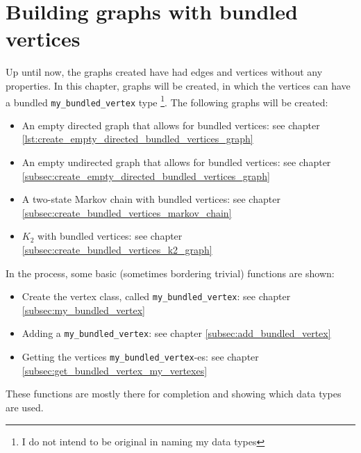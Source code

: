\chapter{Building graphs with bundled vertices}
\label{sec:Building-graphs-with-bundled-vertices}

Up until now, the graphs created have had edges and vertices without any
properties.
In this chapter, graphs will be created, in which the vertices can have
a bundled \verb;my_bundled_vertex; type
\footnote{I do not intend to be original in naming my data types}.
The following graphs will be created:

\begin{itemize}
  \item An empty directed graph that allows for bundled vertices: 
    see chapter \ref{lst:create_empty_directed_bundled_vertices_graph}
  \item An empty undirected graph that allows for bundled vertices: 
    see chapter \ref{subsec:create_empty_directed_bundled_vertices_graph}
  \item A two-state Markov chain with bundled vertices: 
    see chapter \ref{subsec:create_bundled_vertices_markov_chain}
  \item $K_{2}$ with bundled vertices: 
    see chapter \ref{subsec:create_bundled_vertices_k2_graph}
\end{itemize}

In the process, some basic (sometimes bordering trivial) functions are shown:

\begin{itemize}
  \item 
    Create the vertex class, called \verb;my_bundled_vertex;: 
    see chapter \ref{subsec:my_bundled_vertex}
  \item Adding a \verb;my_bundled_vertex;: 
    see chapter \ref{subsec:add_bundled_vertex}
  \item Getting the vertices \verb;my_bundled_vertex;-es: 
    see chapter \ref{subsec:get_bundled_vertex_my_vertexes}
\end{itemize}

These functions are mostly there for completion and showing which data types
are used.

